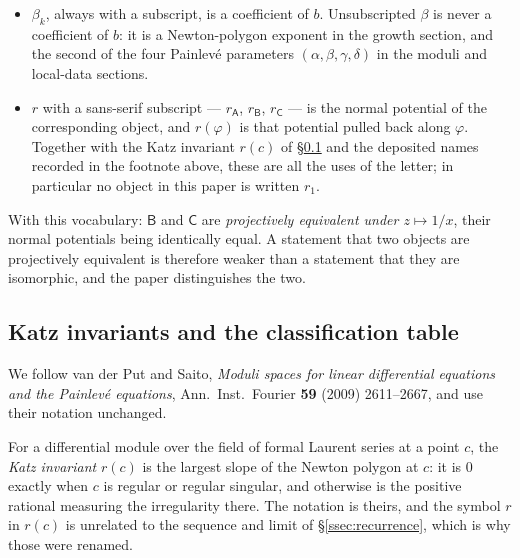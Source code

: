 \begin{itemize}
    double cover is in play. The $u$ of the Rabinowitsch trick, adjoined to
    saturate a localisation, is a different variable and occurs only inside
    that ideal computation.
  \item $\beta_k$, always with a subscript, is a coefficient of $b$.
    Unsubscripted $\beta$ is never a coefficient of $b$: it is a Newton-polygon
    exponent in the growth section, and the second of the four Painlev\'e
    parameters $(\alpha,\beta,\gamma,\delta)$ in the moduli and local-data
    sections.
  \item $r$ with a sans-serif subscript --- $r_{\mathsf A}$, $r_{\mathsf B}$,
    $r_{\mathsf C}$ --- is the normal potential of the corresponding object,
    and $r(\varphi)$ is that potential pulled back along $\varphi$. Together
    with the Katz invariant $r(c)$ of \S\ref{ssec:katz} and the deposited
    names recorded in the footnote above, these are all the uses of the
    letter; in particular no object in this paper is written $r_1$.
\end{itemize}

With this vocabulary: $\mathsf B$ and $\mathsf C$ are \emph{projectively
equivalent under $z\mapsto1/x$}, their normal potentials being identically
equal. A statement that two objects are projectively equivalent is therefore
weaker than a statement that they are isomorphic, and the paper distinguishes
the two.

\subsection{Katz invariants and the classification table}\label{ssec:katz}

We follow van der Put and Saito, \emph{Moduli spaces for linear differential
equations and the Painlev\'e equations}, Ann.\ Inst.\ Fourier \textbf{59} (2009)
2611--2667, and use their notation unchanged.

For a differential module over the field of formal Laurent series at a point
$c$, the \emph{Katz invariant} $r(c)$ is the largest slope of the Newton
polygon at $c$: it is $0$ exactly when $c$ is regular or regular singular, and
otherwise is the positive rational measuring the irregularity there. The
notation is theirs, and the symbol $r$ in $r(c)$ is unrelated to the sequence
and limit of \S\ref{ssec:recurrence}, which is why those were renamed.

